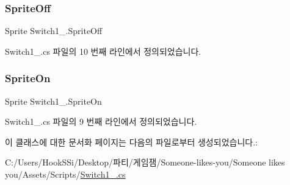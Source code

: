 \mbox{\label{class_switch1__1_abbab824f0aa3888dfb8f369f8025bd8e}} 
\subsubsection{\texorpdfstring{SpriteOff}{SpriteOff}}
{\footnotesize\ttfamily Sprite Switch1\+\_.\+Sprite\+Off}



Switch1\+\_.\+cs 파일의 10 번째 라인에서 정의되었습니다.

\mbox{\label{class_switch1__1_a006c0e37c5191ee6a144bf2e7c80e0ad}} 
\subsubsection{\texorpdfstring{SpriteOn}{SpriteOn}}
{\footnotesize\ttfamily Sprite Switch1\+\_.\+Sprite\+On}



Switch1\+\_.\+cs 파일의 9 번째 라인에서 정의되었습니다.



이 클래스에 대한 문서화 페이지는 다음의 파일로부터 생성되었습니다.\+:\begin{DoxyCompactItemize}
\item 
C\+:/\+Users/\+Hook\+S\+Si/\+Desktop/파티/게임잼/\+Someone-\/likes-\/you/\+Someone likes you/\+Assets/\+Scripts/\mbox{\hyperlink{_switch1__1_8cs}{Switch1\+\_.\+cs}}\end{DoxyCompactItemize}
